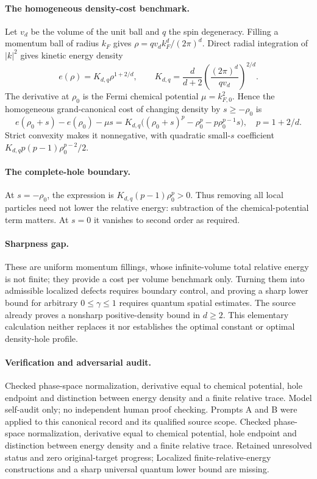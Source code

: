 \documentclass[11pt]{article}
\begin{document}
\paragraph{The homogeneous density-cost benchmark.} Let $v_d$ be the volume of the unit ball and $q$ the spin degeneracy. Filling a momentum ball of radius $k_F$ gives $\rho=qv_dk_F^d/(2\pi)^d$. Direct radial integration of $|k|^2$ gives kinetic energy density
\[
 e(\rho)=K_{d,q}\rho^{1+2/d},\qquad
 K_{d,q}=\frac d{d+2}\left(\frac{(2\pi)^d}{qv_d}\right)^{2/d}.
\]
The derivative at $\rho_0$ is the Fermi chemical potential $\mu=k_{F,0}^2$. Hence the homogeneous grand-canonical cost of changing density by $s\geq-\rho_0$ is
\[
 e(\rho_0+s)-e(\rho_0)-\mu s
 =K_{d,q}\bigl((\rho_0+s)^p-\rho_0^p-p\rho_0^{p-1}s\bigr),\quad p=1+2/d.
\]
Strict convexity makes it nonnegative, with quadratic small-$s$ coefficient $K_{d,q}p(p-1)\rho_0^{p-2}/2$.

\paragraph{The complete-hole boundary.} At $s=-\rho_0$, the expression is $K_{d,q}(p-1)\rho_0^p>0$. Thus removing all local particles need not lower the relative energy: subtraction of the chemical-potential term matters. At $s=0$ it vanishes to second order as required.

\paragraph{Sharpness gap.} These are uniform momentum fillings, whose infinite-volume total relative energy is not finite; they provide a cost per volume benchmark only. Turning them into admissible localized defects requires boundary control, and proving a sharp lower bound for arbitrary $0\leq\gamma\leq1$ requires quantum spatial estimates. The source already proves a nonsharp positive-density bound in $d\geq2$. This elementary calculation neither replaces it nor establishes the optimal constant or optimal density-hole profile.

\paragraph{Verification and adversarial audit.}
Checked phase-space normalization, derivative equal to chemical potential, hole endpoint and distinction between energy density and a finite relative trace. Model self-audit only; no independent human proof checking. Prompts A and B were applied to this canonical record and its qualified source scope. Checked phase-space normalization, derivative equal to chemical potential, hole endpoint and distinction between energy density and a finite relative trace. Retained unresolved status and zero original-target progress; Localized finite-relative-energy constructions and a sharp universal quantum lower bound are missing.
\end{document}
